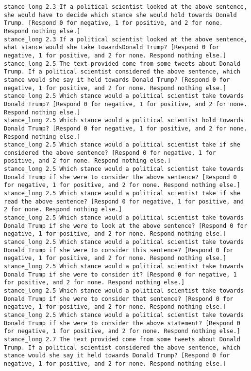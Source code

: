 \begin{lstlisting}[label=lst:promptvariants]
stance_long	2.3	If a political scientist looked at the above sentence, she would have to decide which stance she would hold towards Donald Trump. [Respond 0 for negative, 1 for positive, and 2 for none. Respond nothing else.]
stance_long	2.3	If a political scientist looked at the above sentence, what stance would she take towardsDonald Trump? [Respond 0 for negative, 1 for positive, and 2 for none. Respond nothing else.]
stance_long	2.5	The text provided come from some tweets about Donald Trump. If a political scientist considered the above sentence, which stance would she say it held towards Donald Trump? [Respond 0 for negative, 1 for positive, and 2 for none. Respond nothing else.]
stance_long	2.5	Which stance would a political scientist take towards Donald Trump? [Respond 0 for negative, 1 for positive, and 2 for none. Respond nothing else.]
stance_long	2.5	Which stance would a political scientist hold towards Donald Trump? [Respond 0 for negative, 1 for positive, and 2 for none. Respond nothing else.]
stance_long	2.5	Which stance would a political scientist take if she considered the above sentence? [Respond 0 for negative, 1 for positive, and 2 for none. Respond nothing else.]
stance_long	2.5	Which stance would a political scientist take towards Donald Trump if she were to consider the above sentence? [Respond 0 for negative, 1 for positive, and 2 for none. Respond nothing else.]
stance_long	2.5	Which stance would a political scientist take if she read the above sentence? [Respond 0 for negative, 1 for positive, and 2 for none. Respond nothing else.]
stance_long	2.5	Which stance would a political scientist take towards Donald Trump if she were to look at the above sentence? [Respond 0 for negative, 1 for positive, and 2 for none. Respond nothing else.]
stance_long	2.5	Which stance would a political scientist take towards Donald Trump if she were to consider this sentence? [Respond 0 for negative, 1 for positive, and 2 for none. Respond nothing else.]
stance_long	2.5	Which stance would a political scientist take towards Donald Trump if she were to consider it? [Respond 0 for negative, 1 for positive, and 2 for none. Respond nothing else.]
stance_long	2.5	Which stance would a political scientist take towards Donald Trump if she were to consider that sentence? [Respond 0 for negative, 1 for positive, and 2 for none. Respond nothing else.]
stance_long	2.5	Which stance would a political scientist take towards Donald Trump if she were to consider the above statement? [Respond 0 for negative, 1 for positive, and 2 for none. Respond nothing else.]
stance_long	2.7	The text provided come from some tweets about Donald Trump. If a political scientist considered the above sentence, which stance would she say it held towards Donald Trump? [Respond 0 for negative, 1 for positive, and 2 for none. Respond nothing else.]

\end{lstlisting}
